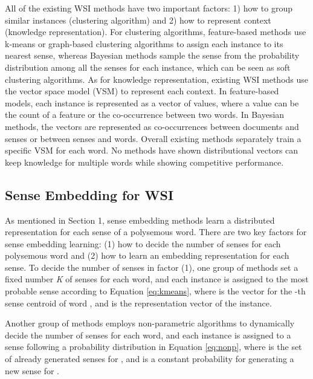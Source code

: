 \documentclass[11pt]{article}
\begin{document}
All of the existing WSI methods have two important factors: 1) how to group similar instances (clustering algorithm) and 2) how to represent context (knowledge representation).
For clustering algorithms, 
feature-based methods use k-means or graph-based clustering algorithms to assign each instance to its nearest sense, 
whereas Bayesian methods sample the sense from the probability distribution among all the senses for each instance, 
which can be seen as soft clustering algorithms. 
As for knowledge representation, existing WSI methods use the vector space model (VSM) to represent each context. 
In feature-based models, each instance is represented as a vector of values, where a value can be the count of a feature or the co-occurrence between two words.
In Bayesian methods, 
the vectors are represented as co-occurrences between documents and senses or between senses and words.
Overall existing methods separately train a specific VSM for each word.
No methods have shown distributional vectors can keep knowledge for multiple words while showing competitive performance.



\subsection{Sense Embedding for WSI}





As mentioned in Section 1, sense embedding methods learn a distributed representation for
each sense of a polysemous word. There are two key factors for sense embedding learning: (1) how to decide the number of senses for each polysemous word and (2) how to learn an embedding representation for each sense. 
To decide the number of senses in factor (1), one group of methods \cite{huang-EtAl:2012:ACL20122,neelakantan-EtAl:2014:EMNLP2014} set a fixed number \emph{K} of senses for each word, and each instance is assigned to the most probable sense according to Equation \ref{eq:kmeans}, where  is the vector for the -th sense centroid of word , and  is the representation vector of the instance.



Another group of methods \cite{li-jurafsky:2015:EMNLP} employs non-parametric algorithms to dynamically decide the number of senses for each word, and 
each instance is assigned to a sense following a probability distribution in Equation \ref{eq:nonp}, where  is the set of already generated senses for , and  is a constant probability for generating a new sense for .
\end{document}
